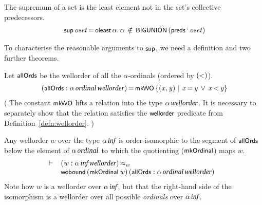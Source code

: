 \documentclass[11pt]{llncs}
\renewcommand{\HOLConst}[1]{{\textsf{\upshape\small #1}}}
\renewcommand{\HOLTyOp}[1]{\mbox{\fontencoding{T1}\fontfamily{bch}\fontseries{m}\fontshape{it}\fontsize{9.5}{10}\selectfont #1}}
\renewcommand{\HOLinline}[1]{\ensuremath{#1}}
\newcommand{\holthmenv}[1]{\begin{array}[t]{l}#1\end{array}}
\newenvironment{holmath}{\begin{displaymath}\begin{array}{l}}{\end{array}\end{displaymath}\ignorespacesafterend}
\begin{document}
\begin{definition}
\label{defn:sup}
The supremum of a set is the least element not in the set's collective predecessors.
\begin{holmath}
\,\,\HOLConst{sup}\,\HOLFreeVar{oset}\,{\ensuremath{=}}\,\HOLConst{oleast}\,\HOLBoundVar{\ensuremath{\alpha}}\ensuremath{.}\,\HOLBoundVar{\ensuremath{\alpha}}\,\HOLTokenNotIn{}\,\HOLConst{BIGUNION}\,(\HOLConst{preds}\,\textrm{`}\,\HOLFreeVar{oset})
\end{holmath}
\end{definition}

To characterise the reasonable arguments to \HOLinline{\HOLConst{sup}}, we need a definition and two further theorems.

\begin{definition}
Let \HOLinline{\HOLConst{allOrds}} be the wellorder of all the $\alpha$-ordinals (ordered by \HOLinline{(\HOLConst{\ensuremath{{<}}})}).\begin{holmath}
\,\,(\HOLConst{allOrds} :\ensuremath{\alpha}\,\HOLTyOp{ordinal}\,\HOLTyOp{wellorder})\,{\ensuremath{=}}\,\HOLConst{mkWO}\,\ensuremath{{\{}}(\HOLBoundVar{x},\HOLBoundVar{y})\,\ensuremath{{\,\mid\,}}\,\HOLBoundVar{x}\,{\ensuremath{=}}\,\HOLBoundVar{y}\,\HOLTokenDisj{}\,\HOLBoundVar{x}\,\ensuremath{{<}}\,\HOLBoundVar{y}\ensuremath{{\}}}
\end{holmath}
(%
The constant \HOLinline{\HOLConst{mkWO}} lifts a relation into the type \HOLinline{\ensuremath{\alpha}\,\HOLTyOp{wellorder}}.
It is necessary to separately show that the relation satisfies the \HOLinline{\HOLConst{wellorder}} predicate from Definition~\ref{defn:wellorder}.%
)
\end{definition}

\begin{theorem}
\label{thm:wellorder-allOrds}
Any wellorder $w$ over the type \HOLinline{\ensuremath{\alpha}\,\HOLTyOp{inf}} is order-isomorphic to the segment of \HOLinline{\HOLConst{allOrds}} below the element of \HOLinline{\ensuremath{\alpha}\,\HOLTyOp{ordinal}} to which the quotienting (\HOLinline{\HOLConst{mkOrdinal}}) maps $w$.
\[
\vdash \;\holthmenv{(\HOLFreeVar{w} :\ensuremath{\alpha}\,\HOLTyOp{inf}\,\HOLTyOp{wellorder})\,\ensuremath{{\approx_w}}\\
\HOLConst{wobound}\,(\HOLConst{mkOrdinal}\,\HOLFreeVar{w})\,(\HOLConst{allOrds} :\ensuremath{\alpha}\,\HOLTyOp{ordinal}\,\HOLTyOp{wellorder})}
\]
Note how $w$ is a wellorder over \HOLinline{\ensuremath{\alpha}\,\HOLTyOp{inf}}, but that the right-hand side of the isomorphism is a wellorder over all possible \emph{ordinals} over \HOLinline{\ensuremath{\alpha}\,\HOLTyOp{inf}}.
\end{theorem}
\end{document}
